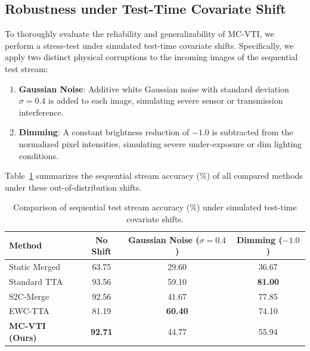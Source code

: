 \documentclass{article}
\theoremstyle{plain}
\theoremstyle{definition}
\theoremstyle{remark}
\begin{document}
\subsection{Robustness under Test-Time Covariate Shift}
To thoroughly evaluate the reliability and generalizability of MC-VTI, we perform a stress-test under simulated test-time covariate shifts. Specifically, we apply two distinct physical corruptions to the incoming images of the sequential test stream:
\begin{enumerate}
  \item \textbf{Gaussian Noise}: Additive white Gaussian noise with standard deviation $\sigma=0.4$ is added to each image, simulating severe sensor or transmission interference.
  \item \textbf{Dimming}: A constant brightness reduction of $-1.0$ is subtracted from the normalized pixel intensities, simulating severe under-exposure or dim lighting conditions.
\end{enumerate}

Table~\ref{tab:covariate_shift} summarizes the sequential stream accuracy (\%) of all compared methods under these out-of-distribution shifts.

\begin{table}[ht]
  \caption{Comparison of sequential test stream accuracy (\%) under simulated test-time covariate shifts.}
  \label{tab:covariate_shift}
  \vskip 0.15in
  \begin{center}
  \begin{small}
  \begin{sc}
  \begin{tabular}{lccc}
    \toprule
    Method & No Shift & Gaussian Noise ($\sigma=0.4$) & Dimming ($-1.0$) \\
    \midrule
    Static Merged  & 63.75 & 29.60 & 36.67 \\
    Standard TTA   & 93.56 & 59.10 & \textbf{81.00} \\
    S2C-Merge      & 92.56 & 41.67 & 77.85 \\
    EWC-TTA        & 81.19 & \textbf{60.40} & 74.10 \\
    \textbf{MC-VTI (Ours)} & \textbf{92.71} & 44.77 & 55.94 \\
    \bottomrule
  \end{tabular}
  \end{sc}
  \end{small}
  \end{center}
  \vskip -0.1in
\end{table}
\end{document}
